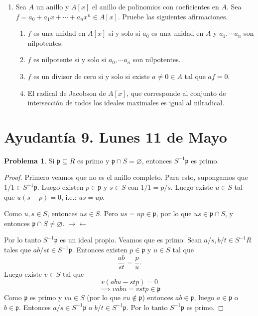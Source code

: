 \documentclass{article}
\theoremstyle{definition}
\newtheorem{problem}{Problema}[section]
\theoremstyle{remark}
\numberwithin{equation}{section}
\begin{document}
\begin{enumerate}
\item Sea $A$ un anillo y $A[x]$ el anillo de polinomios con coeficientes en $A$. Sea $f=a_0+a_1x+ \cdots +a_nx^n \in A[x]$. Pruebe las siguientes afirmaciones.

\begin{enumerate}
    \item $f$ es una unidad en $A[x]$ si y solo si $a_0$ es una unidad en $A$ y $a_1, \cdots a_n$ son nilpotentes.
    \item $f$ es nilpotente si y solo si $a_0, \cdots a_n$ son nilpotentes.
    \item $f$ es un divisor de cero si y solo si existe $a \neq 0 \in A$ tal que $af =0$.
    \item El radical de Jacobson de $A[x]$, que corresponde al conjunto de intersección de todos los ideales maximales es igual al nilradical.
\end{enumerate}
\end{enumerate}

\newpage
\section{Ayudantía 9. Lunes 11 de Mayo}

\newcommand{\p}{\mathfrak{p}}
\begin{problem}
Si $\p \subseteq R$ es primo y $\p \cap S = \varnothing$, entonces $S^{-1} \p$ es primo.
\end{problem}
\begin{proof}
  Primero veamos que no es el anillo completo. Para esto, supongamos que $1/1 \in S^{-1}\p$. Luego existen $p \in \p$ y $s \in S$ con $1/1 = p/s$. Luego existe $u \in S$ tal que $u(s-p) = 0$, i.e.: $us = up$.

  Como $u,s \in S$, entonces $us \in S$. Pero $us = up \in \p$, por lo que $us \in \p \cap S$, y entonces $\p \cap S \neq \varnothing$. \(\to\gets\)

  Por lo tanto $S^{-1} \p$ es un ideal propio. Veamos que es primo:
  Sean $a/s, b/t \in S^{-1} R$ tales que $ab/st \in S^{-1} \p$. Entonces existen $p \in \p$ y $u \in S$ tal que
  \[ \frac{ab}{st} = \frac{p}{u}. \]
  Luego existe $v \in S$ tal que 
  \[ v(abu - stp) = 0 \]
  \[ \implies vabu = vstp \in \p \]
  Como $\p$ es primo y $vu \in S$ (por lo que $vu \notin \p$) entonces $ab \in \p$, luego $a \in \p$ o $b \in \p$. Entonces $a/s \in S^{-1}\p$ o $b/t \in S^{-1} \p$. Por lo tanto $S^{-1} \p$ es primo.
\end{proof}
\end{document}
